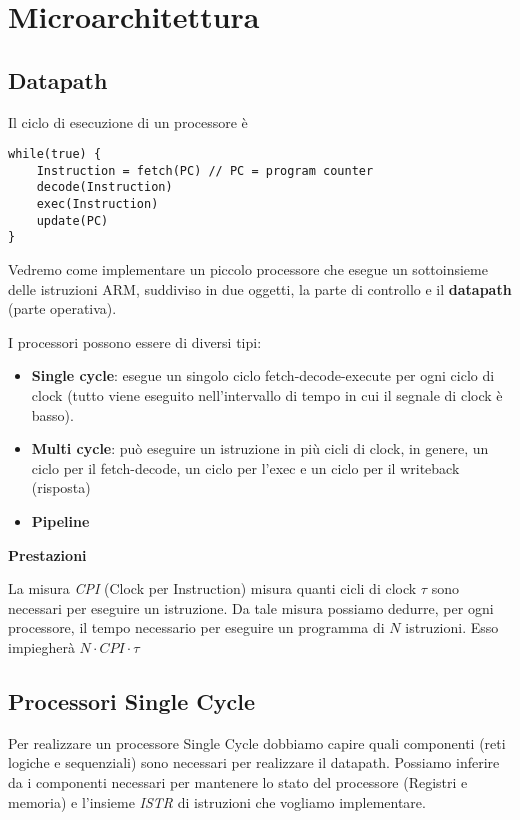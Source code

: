 \chapter{Microarchitettura}

\section{Datapath}

Il ciclo di esecuzione di un processore è

\begin{lstlisting}[frame=single]
while(true) {
    Instruction = fetch(PC) // PC = program counter
    decode(Instruction)
    exec(Instruction)
    update(PC)
}
\end{lstlisting}

Vedremo come implementare un piccolo processore che esegue un sottoinsieme delle istruzioni ARM,
suddiviso in due oggetti, la parte di controllo e il \textbf{datapath} (parte operativa).

I processori possono essere di diversi tipi:
\begin{itemize}
    \item \textbf{Single cycle}: esegue un singolo ciclo fetch-decode-execute per ogni ciclo di clock (tutto viene eseguito nell'intervallo di tempo in cui il segnale di clock è basso).
    \item \textbf{Multi cycle}: può eseguire un istruzione in più cicli di clock, in genere, un ciclo per il fetch-decode, un ciclo per l'exec e un ciclo per il writeback (risposta)
    \item \textbf{Pipeline}
\end{itemize}

\begin{note}
    \textbf{Prestazioni}

    La misura \textit{CPI} (Clock per Instruction) misura quanti cicli di clock $\tau$ sono necessari per eseguire un istruzione.
    Da tale misura possiamo dedurre, per ogni processore, il tempo necessario per eseguire un programma di $N$ istruzioni.
    Esso impiegherà $N \cdot CPI \cdot \tau $
\end{note}


\section{Processori Single Cycle}

Per realizzare un processore Single Cycle dobbiamo capire quali componenti (reti logiche e sequenziali) sono
necessari per realizzare il datapath. Possiamo inferire da i componenti necessari per mantenere lo stato del processore (Registri e memoria)
e l'insieme \textit{ISTR} di istruzioni che vogliamo implementare.

